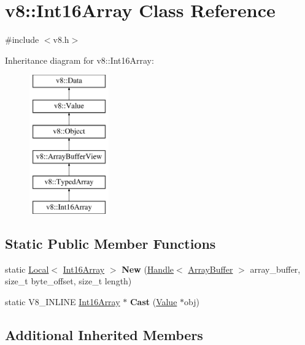 \hypertarget{classv8_1_1Int16Array}{}\section{v8\+:\+:Int16\+Array Class Reference}
\label{classv8_1_1Int16Array}


{\ttfamily \#include $<$v8.\+h$>$}

Inheritance diagram for v8\+:\+:Int16\+Array\+:\begin{figure}[H]
\begin{center}
\leavevmode
\includegraphics[height=6.000000cm]{classv8_1_1Int16Array}
\end{center}
\end{figure}
\subsection*{Static Public Member Functions}
\begin{DoxyCompactItemize}
\item 
\hypertarget{classv8_1_1Int16Array_adc49fddf7e0b2c719085f5f9af3762e5}{}static \hyperlink{classv8_1_1Local}{Local}$<$ \hyperlink{classv8_1_1Int16Array}{Int16\+Array} $>$ {\bfseries New} (\hyperlink{classv8_1_1Handle}{Handle}$<$ \hyperlink{classv8_1_1ArrayBuffer}{Array\+Buffer} $>$ array\+\_\+buffer, size\+\_\+t byte\+\_\+offset, size\+\_\+t length)\label{classv8_1_1Int16Array_adc49fddf7e0b2c719085f5f9af3762e5}

\item 
\hypertarget{classv8_1_1Int16Array_abef12f11ace9c74a4ce451db28b954e5}{}static V8\+\_\+\+I\+N\+L\+I\+N\+E \hyperlink{classv8_1_1Int16Array}{Int16\+Array} $\ast$ {\bfseries Cast} (\hyperlink{classv8_1_1Value}{Value} $\ast$obj)\label{classv8_1_1Int16Array_abef12f11ace9c74a4ce451db28b954e5}

\end{DoxyCompactItemize}
\subsection*{Additional Inherited Members}


